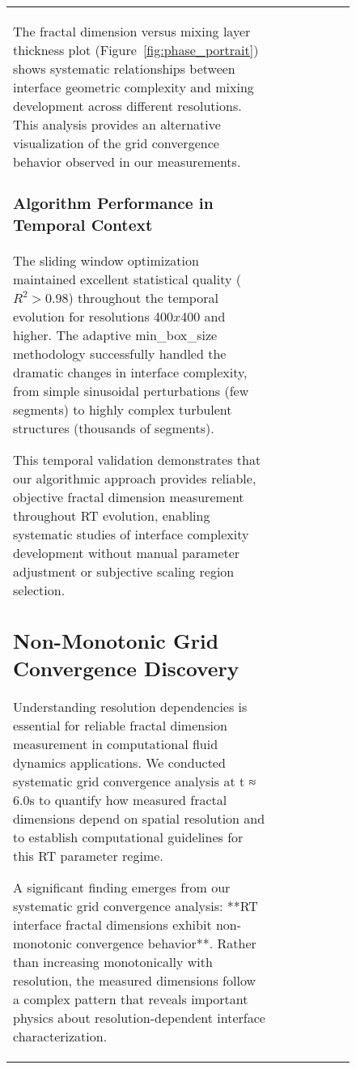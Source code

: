 \documentclass[preprint,12pt]{elsarticle}
\def\times{x}%
\begin{document}
\begin{figure}[ht]
\begin{table}[ht]
\begin{tabular}{|l|c|c|c|c|c|c|}
The fractal dimension versus mixing layer thickness plot (Figure~\ref{fig:phase_portrait}) shows systematic relationships between interface geometric complexity and mixing development across different resolutions. This analysis provides an alternative visualization of the grid convergence behavior observed in our measurements.

\subsubsection{Algorithm Performance in Temporal Context}

The sliding window optimization maintained excellent statistical quality ($R^2 > 0.98$) throughout the temporal evolution for resolutions 400$\times$400 and higher. The adaptive min\_box\_size methodology successfully handled the dramatic changes in interface complexity, from simple sinusoidal perturbations (few segments) to highly complex turbulent structures (thousands of segments).

This temporal validation demonstrates that our algorithmic approach provides reliable, objective fractal dimension measurement throughout RT evolution, enabling systematic studies of interface complexity development without manual parameter adjustment or subjective scaling region selection.

\subsection{Non-Monotonic Grid Convergence Discovery}
\label{subsec:grid_convergence}

Understanding resolution dependencies is essential for reliable fractal dimension measurement in computational fluid dynamics applications. We conducted systematic grid convergence analysis at t ≈ 6.0s to quantify how measured fractal dimensions depend on spatial resolution and to establish computational guidelines for this RT parameter regime.

A significant finding emerges from our systematic grid convergence analysis: **RT interface fractal dimensions exhibit non-monotonic convergence behavior**. Rather than increasing monotonically with resolution, the measured dimensions follow a complex pattern that reveals important physics about resolution-dependent interface characterization.


\end{tabular}
\end{table}
\end{figure}
\end{document}
